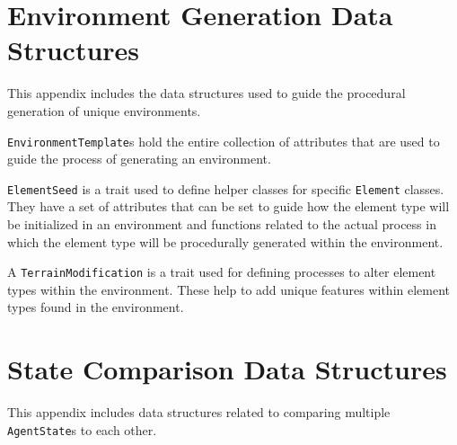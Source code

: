 \pagebreak
\tocless\section{Environment Generation Data Structures} \label{sec:environment_generation_data_structures}
This appendix includes the data structures used to guide the procedural generation of unique environments.

\begin{appxlst}
  \caption{\texttt{EnvironmentTemplate}s hold the entire collection of attributes that are used to guide the process of generating an environment.}
 \label{appendix:environmenttemplate_class}
\end{appxlst}
\vspace*{-2em}


\begin{appxlst}
  \caption{\texttt{ElementSeed} is a trait used to define helper classes for specific \texttt{Element} classes. They have a set of attributes that can be set to guide how the element type will be initialized in an environment and functions related to the actual process in which the element type will be procedurally generated within the environment.}
 \label{appendix:elementseed_trait}
\end{appxlst}
\vspace*{-2em}


\begin{appxlst}
  \caption{A \texttt{TerrainModification} is a trait used for defining processes to alter element types within the environment. These help to add unique features within element types found in the environment.}
 \label{appendix:terrainmodification_trait}
\end{appxlst}





\pagebreak
\tocless\section{State Comparison Data Structures} \label{sec:state_comparison_data_structures}
This appendix includes data structures related to comparing multiple \texttt{AgentState}s to each other.

